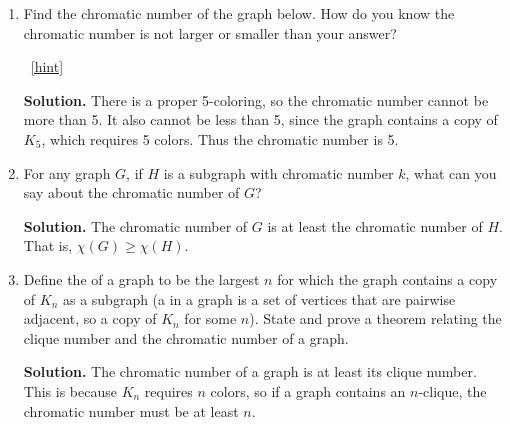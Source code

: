 \documentclass{book}
\begin{document}
\setcounter{project}{42}
\addtocounter{project}{-1}
\begin{activity}[]\label{activity-35}
\leavevmode%
\begin{enumerate}[font=\bfseries,label=(\alph*),ref=\alph*]
\item\label{task-55} \hypertarget{p-394}{}%
Find the chromatic number of the graph below.  How do you know the chromatic number is not larger or smaller than your answer?%
\begin{sidebyside}{1}{0.375}{0.375}{0}
\begin{sbspanel}{0.25}
\end{sbspanel}
\end{sidebyside}
~\hfill{\tiny\hyperlink{a-42.a}{[hint]}\hypertarget{q-42.a}{}}\par\smallskip%
\noindent\textbf{Solution.}\hypertarget{solution-39}{}\quad%
\hypertarget{p-396}{}%
There is a proper 5-coloring, so the chromatic number cannot be more than 5.  It also cannot be less than 5, since the graph contains a copy of \(K_5\), which requires 5 colors.  Thus the chromatic number is 5.%
\item\label{task-56} \hypertarget{p-397}{}%
For any graph \(G\), if \(H\) is a subgraph with chromatic number \(k\), what can you say about the chromatic number of \(G\)?%
\par\smallskip%
\noindent\textbf{Solution.}\hypertarget{solution-40}{}\quad%
\hypertarget{p-398}{}%
The chromatic number of \(G\) is at least the chromatic number of \(H\).  That is, \(\chi(G) \ge \chi(H)\).%
\item\label{task-57} \hypertarget{p-399}{}%
Define the  of a graph to be the largest \(n\) for which the graph contains a copy of \(K_n\) as a subgraph (a  in a graph is a set of vertices that are pairwise adjacent, so a copy of \(K_n\) for some \(n\)).  State and prove a theorem relating the clique number and the chromatic number of a graph.%
\par\smallskip%
\noindent\textbf{Solution.}\hypertarget{solution-41}{}\quad%
\hypertarget{p-400}{}%
The chromatic number of a graph is at least its clique number.  This is because \(K_n\) requires \(n\) colors, so if a graph contains an \(n\)-clique, the chromatic number must be at least \(n\).%
\end{enumerate}
\end{activity}
\end{document}
